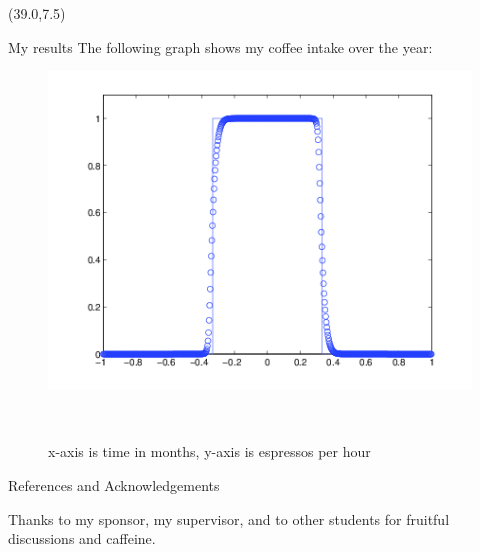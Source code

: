\documentclass[final]{beamer}
\begin{document}
\begin{frame}{}
\begin{textblock}{19.0}(39.0,7.5)
\begin{block}{My results}
The following graph shows my coffee intake over the year:\\
\begin{figure}
\begin{minipage}{0.95\linewidth}
\includegraphics[width = \linewidth]{ENOTest3b.png}
\end{minipage}\\
\begin{minipage}{0.95\linewidth}
\caption{x-axis is time in months, y-axis is espressos per hour}
\label{fig:CoffeeFig}
\end{minipage}
\end{figure}
\end{block}

\begin{block}{References and Acknowledgements}
\begin{minipage}{0.9\linewidth}
     {     \printbibliography   %
     } 
\end{minipage}
\vspace{2ex}
{
\tiny Thanks to my sponsor, my supervisor, and to other students for
  fruitful discussions and caffeine.
\par
}
\end{block}

\end{textblock}

\end{frame}
\end{document}
